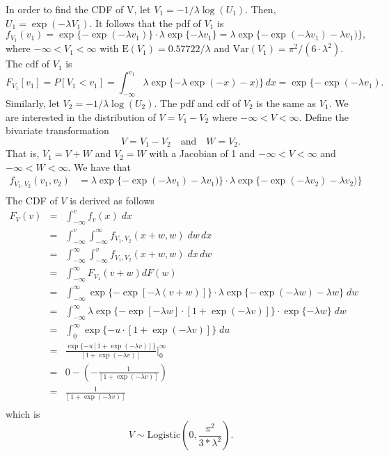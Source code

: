 In order to find the CDF of V, let $V_1= -1/\lambda \log(U_1).$ Then, $U_1 = \exp(-\lambda V_1).$ It follows that the pdf of $V_1$ is
\begin{equation}
f_{V_1}(v_1) = \exp\{- \exp(-\lambda v_1)\}\cdot \lambda \exp\{- \lambda v_1\} =  \lambda \exp\{- \exp(-\lambda v_1) - \lambda v_1)\},
\end{equation}
where $-\infty < V_1 < \infty$ with $\text{E}(V_1) = 0.57722/\lambda$ and $\text{Var}(V_1)=  \pi^{2}/(6 \cdot \lambda^2).$ The cdf of $V_1$ is
\begin{equation}
F_{V_1}[v_1] = P[V_1 < v_1] = \int_{- \infty} ^ {v_1}   \lambda \exp\{-\lambda \exp(-x) - x)\} \, dx = \exp \{ -\exp (-\lambda v_1).
\end{equation}
Similarly, let $V_2 = -1/\lambda \log(U_2).$ The pdf and cdf of $V_2$ is the same as $V_1.$
We are interested in the distribution of $V = V_1 - V_2$ where $-\infty < V < \infty.$ Define the bivariate transformation
\begin{equation}
V = V_1 - V_2 \quad \text{and} \quad W = V_2.
\end{equation}
That is, $V_1 = V + W$ and $V_2 = W$ with a Jacobian of 1 and $-\infty < V < \infty$ and $-\infty < W < \infty.$
We have that
\begin{eqnarray*}
f_{V_1, V_2}(v_1, v_2) &= \lambda \exp\{- \exp(-\lambda v_1) - \lambda v_1)\} \cdot \lambda \exp\{- \exp(- \lambda v_2) - \lambda v_2)\}\\
\end{eqnarray*}
The CDF of $V$ is derived as follows
\begin{eqnarray*}
F_V(v) &=& \int_{-\infty}^{v} f_v(x) \; dx \\
&=& \int_{-\infty}^{v} \int_{-\infty}^{\infty} f_{V_1, V_2}(x + w, w) \;dw\, dx \\
&=&  \int_{-\infty}^{\infty}\int_{-\infty}^{v} f_{V_1, V_2}(x + w, w) \;dx\, dw \\
&=&  \int_{-\infty}^{\infty} F_{V_1}(v + w)  dF(w) \\
&=&  \int_{-\infty}^{\infty} \exp \{ -\exp [-\lambda(v +w)] \} \cdot \lambda \exp\{- \exp(- \lambda w) - \lambda w \} \; dw \\
&=&  \int_{-\infty}^{\infty} \lambda \exp \{- \exp [- \lambda w] \cdot [1+ \exp  (- \lambda v )] \} \cdot \exp \{ - \lambda w \}  \; dw \\
&=&  \int_{0}^{\infty} \exp \{-u \cdot[1+\exp(- \lambda v)]\}   \; du \\  
&=& \frac{\exp \{ -u[1+\exp(- \lambda v)]\}}{[1+\exp(- \lambda v)]} \Big|_{0}^{\infty} \\
&=& 0 - (-\frac{1}{[1+\exp(- \lambda v)]}) \\
&=& \frac{1}{[1+\exp(- \lambda v)]} \\
\end{eqnarray*}
which is
$$V \sim \text{Logistic} \left( 0, \frac{\pi^{2}}{3*\lambda^2} \right).$$

